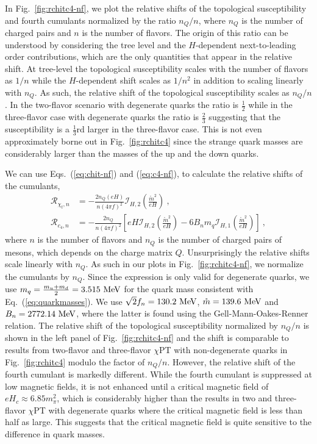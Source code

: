 \documentclass[12pt]{elsarticle}
\begin{document}
In Fig.~\ref{fig:rchitc4-nf}, we plot the relative shifts of the topological susceptibility and fourth cumulants normalized by the ratio $n_{Q}/n$, where $n_{Q}$ is the number of charged pairs and $n$ is the number of flavors. The origin of this ratio can be understood by considering the tree level and the $H$-dependent next-to-leading order contributions, which are the only quantities that appear in the relative shift. At tree-level the topological susceptibility scales with the number of flavors as $1/n$ while the $H$-dependent shift scales as $1/n^{2}$ in addition to scaling linearly with $n_{Q}$. As such, the relative shift of the topological susceptibility scales as $n_{Q}/n$. In the two-flavor scenario with degenerate quarks the ratio is $\tfrac{1}{2}$ while in the three-flavor case with degenerate quarks the ratio is $\tfrac{2}{3}$ suggesting that the susceptibility is a $\tfrac{1}{3}$rd larger in the three-flavor case. This is not even approximately borne out in Fig.~\ref{fig:rchitc4} since the strange quark masses are considerably larger than the masses of the up and the down quarks.

We can use Eqs.~(\ref{eq:chit-nf}) and (\ref{eq:c4-nf}), to calculate the relative shifts of the cumulants,
\begin{align}
\mathcal{R}_{\chi_{t},n}&=-\frac{2n_{Q}(eH)}{n(4\pi f)^{2}}\mathcal{I}_{H,2}(\tfrac{\mathring{m}^{2}}{eH})\ ,\\
\mathcal{R}_{c_{4},n}&=-\frac{2n_{Q}}{n(4\pi f)^{2}}\left[eH\mathcal{I}_{H,2}(\tfrac{\mathring{m}^{2}}{eH})-6B_{n}m_{q}\mathcal{I}_{H,1}(\tfrac{\mathring{m}^{2}}{eH})\right]\ ,
\end{align}
where $n$ is the number of flavors and $n_{Q}$ is the number of charged pairs of mesons, which depends on the charge matrix $Q$. 
Unsurprisingly the relative shifts scale linearly with $n_{Q}$. As such in our plots in Fig.~\ref{fig:rchitc4-nf}, we normalize the cumulants by $n_{Q}$. Since the expression is only valid for degenerate quarks, we use $m_{q}=\tfrac{m_{u}+m_{d}}{2}=3.515\ {\rm MeV}$ for the quark mass consistent with Eq.~(\ref{eq:quarkmasses}). We use $\sqrt{2}f_{n}=130.2\ {\rm MeV}$, $\mathring{m}=139.6\ {\rm MeV}$ and $B_{n}=2772.14\ {\rm MeV}$, where the latter is found using the Gell-Mann-Oakes-Renner relation. The relative shift of the topological susceptibility normalized by $n_{Q}/n$ is shown in the left panel of Fig.~\ref{fig:rchitc4-nf} and the shift is comparable to results from two-flavor and three-flavor $\chi$PT with non-degenerate quarks in Fig.~\ref{fig:rchitc4} modulo the factor of $n_{Q}/n$. However, the relative shift of the fourth cumulant is markedly different. While the fourth cumulant is suppressed at low magnetic fields, it is not enhanced until a critical magnetic field of $eH_{c}\approx6.85m_{\pi}^{2}$, which is considerably higher than the results in two and three-flavor $\chi$PT with degenerate quarks where the critical magnetic field is less than half as large. This suggests that the critical magnetic field is quite sensitive to the difference in quark masses.
\end{document}
